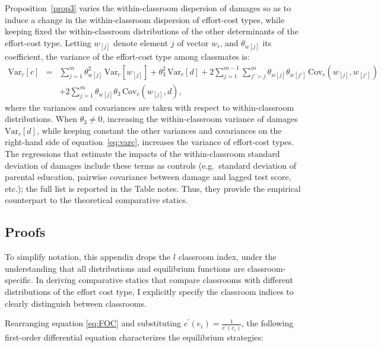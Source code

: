 Proposition~\ref{prop3} varies the within-classroom dispersion of damages so as to induce a change in the within-classroom dispersion of effort-cost types, while keeping fixed the within-classroom distributions of the other determinants of the effort-cost type. Letting $w_{[j]}$ denote element $j$ of vector $w_i$, and $\theta_{w[j]}$ its coefficient, the variance of the effort-cost type among classmates is:
\begin{eqnarray}\label{eq:varc}
\mathrm{Var}_c[c] &=& \sum_{j=1}^m \theta_{w[j]}^2\, \mathrm{Var}_c[w_{[j]}]
+ \theta_3^2\, \mathrm{Var}_c[d]
+ 2\sum_{j=1}^{m-1}\sum_{j'>j}^m \theta_{w[j]}\theta_{w[j']}\,\mathrm{Cov}_c(w_{[j]},w_{[j']}) \\ \nonumber 
&& + 2\sum_{j=1}^m \theta_{w[j]}\theta_3\,\mathrm{Cov}_c(w_{[j]},d),
\end{eqnarray}
\noindent where the variances and covariances are taken with respect to within-classroom distributions. When $\theta_3 \neq 0$, increasing the within-classroom variance of damages $\mathrm{Var}_c[d]$, while keeping constant the other variances and covariances on the right-hand side of equation~\eqref{eq:varc}, increases the variance of effort-cost types. The regressions that estimate the impacts of the within-classroom standard deviation of damages include these terms as controls (e.g.\ standard deviation of parental education, pairwise covariance between damage and lagged test score, etc.); the full list is reported in the Table notes. Thus, they provide the empirical counterpart to the theoretical comparative statics.\par





 \subsection{Proofs}\label{app:theory}
 To simplify notation, this appendix drops the $l$ classroom index, under the understanding that all distributions and equilibrium functions are classroom-specific. In deriving comparative statics that compare classrooms with different distributions of the effort cost type, I explicitly specify the classroom indices to clearly distinguish between classrooms.\par 


 
\noindent Rearranging equation \eqref{eq:FOC} and substituting $c^{\prime}(e_i)=\frac{1}{e^{\prime}(c_i)}$, the following first-order differential equation characterizes the equilibrium strategies:

